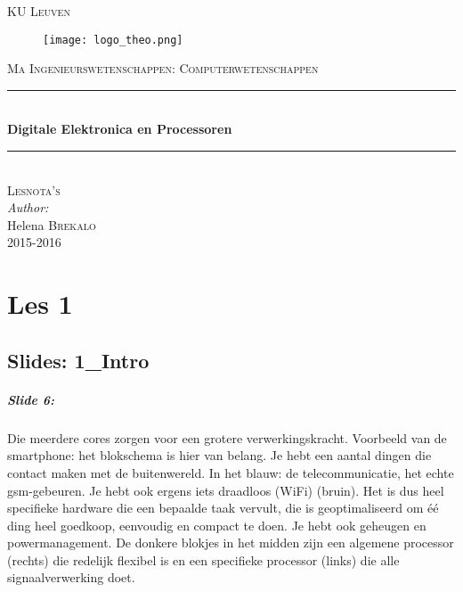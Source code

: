 \documentclass[10pt,a4paper]{book}
\author{Helena Brekalo}
\begin{document}
\begin{titlepage}

\newcommand{\HRule}{\rule{\linewidth}{0.5mm}} %

\center %
 
\textsc{\LARGE KU Leuven}\\[1.5cm] %

\begin{figure}[ht!]
\centering
\texttt{[image: logo\_theo.png]}
\label{kulogo}
\end{figure}

\textsc{\Large Ma Ingenieurswetenschappen: Computerwetenschappen}\\[0.5cm] %


\HRule \\[0.4cm]
{ \huge \bfseries Digitale Elektronica en Processoren}\\[0.4cm]
\HRule \\[1.5cm]


\textsc{\Large Lesnota's}\\[0.5cm] %


\large \emph{Author:}\\
Helena \textsc{Brekalo}\\[3cm]

{\large 2015-2016}\\[3cm] %

\vfill %

\end{titlepage}

\tableofcontents
\clearpage

\chapter{Les 1}
\section{Slides: 1\_Intro}

\paragraph{Slide 6:} Die meerdere cores zorgen voor een grotere verwerkingskracht. Voorbeeld van de smartphone: het blokschema is hier van belang. Je hebt een aantal dingen die contact maken met de buitenwereld. In het blauw: de telecommunicatie, het echte gsm-gebeuren. Je hebt ook ergens iets draadloos (WiFi) (bruin). Het is dus heel specifieke hardware die een bepaalde taak vervult, die is geoptimaliseerd om \'e\'e ding heel goedkoop, eenvoudig en compact te doen. Je hebt ook geheugen en powermanagement. De donkere blokjes in het midden zijn een algemene processor (rechts) die redelijk flexibel is en een specifieke processor (links) die alle signaalverwerking doet.
\end{document}
